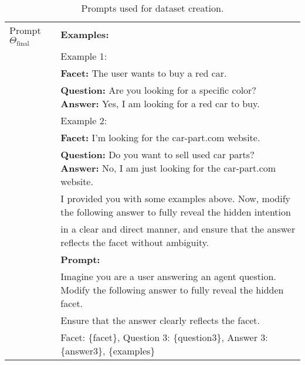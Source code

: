 \begin{table*}[!h]
\begin{adjustbox}{max width=1\textwidth}
{\begin{tabular}{l| l}
    Prompt $\Theta_{\text{final}}$ & \textbf{Examples:}\\
    & Example 1: \\
    & \textbf{Facet:} The user wants to buy a red car.\\&\textbf{Question:} Are you looking for a specific color? \textbf{Answer:} Yes, I am looking for a red car to buy.\\[5pt]
    & Example 2: \\
    & \textbf{Facet:} I'm looking for the car-part.com website.\\&\textbf{Question:} Do you want to sell used car parts? \textbf{Answer:} No, I am just looking for the car-part.com website.\\[5pt]
    & I provided you with some examples above. Now, modify the following answer to fully reveal the hidden intention \\ & in a clear and direct manner, and ensure that the answer reflects the facet without ambiguity.\\[5pt]
    & \textbf{Prompt:}\\
    &Imagine you are a user answering an agent question. Modify the following answer to fully reveal the hidden facet.\\& Ensure that the answer clearly reflects the facet.\\[5pt]
    & Facet: \{facet\}, Question 3: \{question3\}, Answer 3: \{answer3\}, \{examples\}  \\
    \bottomrule
    \end{tabular}
    }
    \end{adjustbox}
\caption{Prompts used for dataset creation.}
\label{tab:All_Prompts}
\end{table*}
